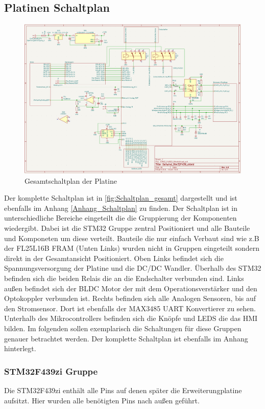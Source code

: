 \subsection{Platinen Schaltplan}
\begin{figure}[H]
	\centering
	\includegraphics[width=1.0\textwidth]{images/Hardware/Schaltplan_Gesamt.PNG}
	\caption{Gesamtschaltplan der Platine}
	\label{fig:Schaltplan_gesamt}
\end{figure}
Der komplette Schaltplan ist in \autoref{fig:Schaltplan_gesamt} dargestellt und ist ebenfalls im Anhang \autoref{Anhang_Schaltplan} zu finden. Der Schaltplan ist in unterschiedliche Bereiche eingeteilt die die Gruppierung der Komponenten wiedergibt. Dabei ist die STM32 Gruppe zentral Positioniert und alle Bauteile und Komponeten um diese verteilt. Bauteile die nur einfach Verbaut sind wie z.B der FL25L16B \ac{FRAM} (Unten Links) wurden nicht in Gruppen eingeteilt sondern direkt in der Gesamtansicht Positioniert. Oben Links befindet sich die Spannungsversorgung der Platine und die \ac{DC}/DC Wandler. Überhalb des STM32 befinden sich die beiden Relais die an die Endschalter verbunden sind. Links außen befindet sich der \ac{BLDC} Motor der mit dem Operationsverstärker und den Optokoppler verbunden ist. Rechts befinden sich alle Analogen Sensoren, bis auf den Stromsensor. Dort ist ebenfalls der MAX3485 \ac{UART} Konvertierer zu sehen. Unterhalb des Mikrocontrollers befinden sich die Knöpfe und LEDS die das \ac{HMI} bilden. Im folgenden sollen exemplarisch die Schaltungen für diese Gruppen genauer betrachtet werden. Der komplette Schaltplan ist ebenfalls im Anhang hinterlegt.
\subsubsection{STM32F439zi Gruppe}
Die STM32F439zi enthält alle Pins auf denen später die Erweiterungplatine aufsitzt. Hier wurden alle benötigten Pins nach außen geführt.
